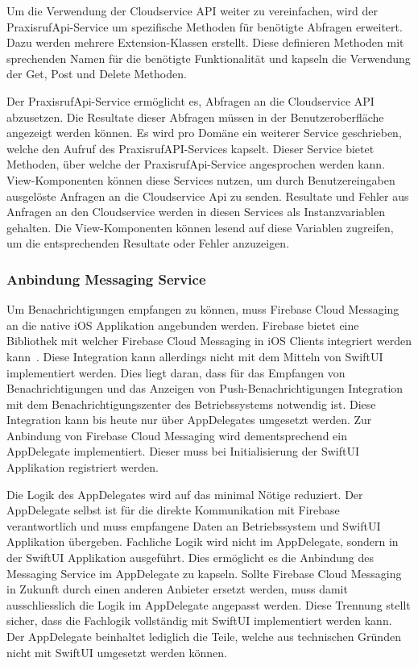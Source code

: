Um die Verwendung der Cloudservice API weiter zu vereinfachen, wird der PraxisrufApi-Service um spezifische Methoden für benötigte Abfragen erweitert.
Dazu werden mehrere Extension-Klassen erstellt.
Diese definieren Methoden mit sprechenden Namen für die benötigte Funktionalität und kapseln die Verwendung der Get, Post und Delete Methoden.

Der PraxisrufApi-Service ermöglicht es, Abfragen an die Cloudservice API abzusetzen.
Die Resultate dieser Abfragen müssen in der Benutzeroberfläche angezeigt werden können.
Es wird pro Domäne ein weiterer Service geschrieben, welche den Aufruf des PraxisrufAPI-Services kapselt.
Dieser Service bietet Methoden, über welche der PraxisrufApi-Service angesprochen werden kann.
View-Komponenten können diese Services nutzen, um durch Benutzereingaben ausgelöste Anfragen an die Cloudservice Api zu senden.
Resultate und Fehler aus Anfragen an den Cloudservice werden in diesen Services als Instanzvariablen gehalten.
Die View-Komponenten können lesend auf diese Variablen zugreifen, um die entsprechenden Resultate oder Fehler anzuzeigen.

\subsubsection{Anbindung Messaging Service}

Um Benachrichtigungen empfangen zu können, muss Firebase Cloud Messaging an die native iOS Applikation angebunden werden.
Firebase bietet eine Bibliothek mit welcher Firebase Cloud Messaging in iOS Clients integriert werden kann~\cite{firebase_ios}.
Diese Integration kann allerdings nicht mit dem Mitteln von SwiftUI implementiert werden.
Dies liegt daran, dass für das Empfangen von Benachrichtigungen und das Anzeigen von Push-Benachrichtigungen Integration mit dem Benachrichtigungszenter des Betriebssystems notwendig ist.
Diese Integration kann bis heute nur über AppDelegates umgesetzt werden.
Zur Anbindung von Firebase Cloud Messaging wird dementsprechend ein AppDelegate implementiert.
Dieser muss bei Initialisierung der SwiftUI Applikation registriert werden.

Die Logik des AppDelegates wird auf das minimal Nötige reduziert.
Der AppDelegate selbst ist für die direkte Kommunikation mit Firebase verantwortlich und muss empfangene Daten an Betriebssystem und SwiftUI Applikation übergeben.
Fachliche Logik wird nicht im AppDelegate, sondern in der SwiftUI Applikation ausgeführt.
Dies ermöglicht es die Anbindung des Messaging Service im AppDelegate zu kapseln.
Sollte Firebase Cloud Messaging in Zukunft durch einen anderen Anbieter ersetzt werden, muss damit ausschliesslich die Logik im AppDelegate angepasst werden.
Diese Trennung stellt sicher, dass die Fachlogik vollständig mit SwiftUI implementiert werden kann.
Der AppDelegate beinhaltet lediglich die Teile, welche aus technischen Gründen nicht mit SwiftUI umgesetzt werden können.

